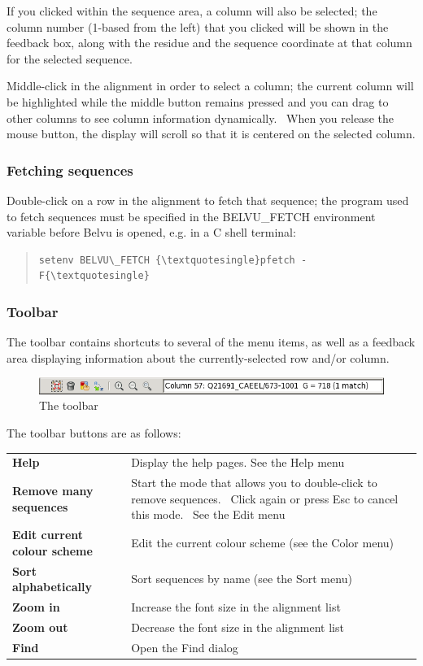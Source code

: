 \documentclass[letterpaper]{article}
\begin{document}
If you clicked within the sequence area, a column will also be selected; the column number (1-based from the left) that you clicked will be shown in the feedback box, along with the residue and the sequence coordinate at that column for the selected sequence.

Middle-click in the alignment in order to select a column; the current column will be highlighted while the middle button remains pressed and you can drag to other columns to see column information dynamically. \ When you release the mouse button, the display will scroll so that it is centered on the selected column.

\subsubsection[Fetching sequences]{Fetching sequences}
Double-click on a row in the alignment to fetch that sequence; the program used to fetch sequences must be specified in the BELVU\_FETCH environment variable before Belvu is opened, e.g. in a C shell terminal:

\begin{quote}
\begin{verbatim}
setenv BELVU\_FETCH {\textquotesingle}pfetch -F{\textquotesingle}
\end{verbatim}
\end{quote}

\subsubsection[Toolbar]{Toolbar}
The toolbar contains shortcuts to several of the menu items, as well as a feedback area displaying information about the currently-selected row and/or column.


\begin{figure}[htb]
\centering
\color{lightblue}
\includegraphics[width=\textwidth]{img_toolbar.png}
\caption{The toolbar}
\label{fig:toolbar}
\end{figure}

The toolbar buttons are as follows:

\begin{supertabular}{>{\bfseries}p{0.4\textwidth} p{0.6\textwidth}}
Help &
Display the help pages. See the Help menu\\
Remove many sequences &
Start the mode that allows you to double-click to remove sequences. \ Click again or press Esc to cancel this mode. \ See the Edit menu\\
Edit current colour scheme &
Edit the current colour scheme (see the Color menu)\\
Sort alphabetically &
Sort sequences by name (see the Sort menu)\\
Zoom in &
Increase the font size in the alignment list\\
Zoom out &
Decrease the font size in the alignment list\\
Find &
Open the Find dialog\\
\end{supertabular}
\end{document}
